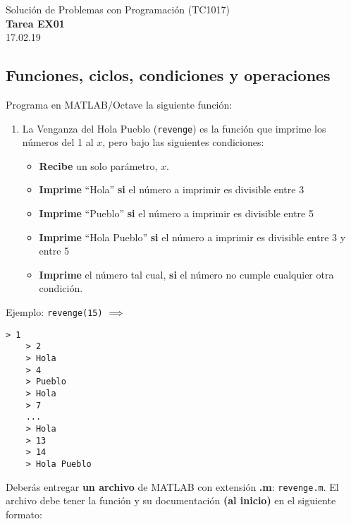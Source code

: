 \documentclass[]{book}
\newcommand{\matlab}[1]{\lstinline[style=Matlab-pyglike]!#1!}
\theoremstyle{definition}
\begin{document}
\begin{center}
{\huge Solución de Problemas con Programación (TC1017)}\\[1.5ex]
{\large \textbf{Tarea EX01}\\[1.5ex] %
17.02.19} %
\end{center}

\vspace{0.2 cm}

\subsection*{Funciones, ciclos, condiciones y operaciones}

Programa en MATLAB/Octave la siguiente función:

\begin{enumerate}[label=\alph*)]
    \itemsep2.5ex
    \item La Venganza del Hola Pueblo (\matlab{revenge}) es la función que imprime los números del 1 al $x$, pero bajo las siguientes condiciones: 
    \begin{itemize}
        \item \textbf{Recibe} un solo parámetro, $x$.
        \item \textbf{Imprime} ``Hola'' \textbf{si} el número a imprimir es divisible entre 3
        \item \textbf{Imprime} ``Pueblo'' \textbf{si} el número a imprimir es divisible entre 5
        \item \textbf{Imprime} ``Hola Pueblo'' \textbf{si} el número a imprimir es divisible entre 3 y entre 5
        \item \textbf{Imprime} el número tal cual, \textbf{si} el número no cumple cualquier otra condición.
    \end{itemize}
\end{enumerate}

Ejemplo: \texttt{revenge(15)} $\implies$
\begin{lstlisting}[style=Matlab-editor]
    > 1
    > 2
    > Hola
    > 4
    > Pueblo
    > Hola
    > 7
    ...
    > Hola
    > 13
    > 14
    > Hola Pueblo
\end{lstlisting}

\bigskip

Deberás entregar \textbf{un archivo} de MATLAB con extensión \textbf{.m}: \texttt{revenge.m}.
El archivo debe tener la función y su documentación \textbf{(al inicio)} en el siguiente formato:
\end{document}
